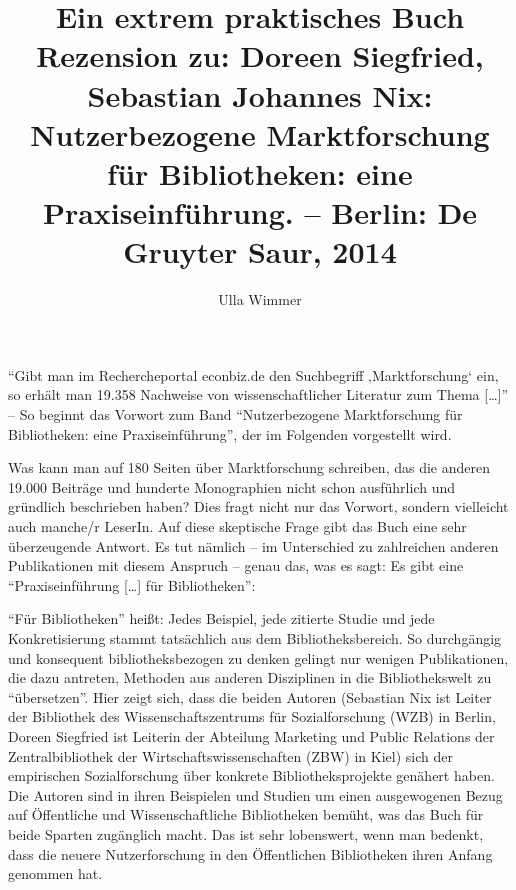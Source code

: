 \documentclass[a4paper,
fontsize=11pt,
oneside,
numbers=noperiodatend,
parskip=half-,
bibliography=totoc,
final
]{scrartcl}
\title{\LARGE{Ein extrem praktisches Buch} \\ \large{Rezension zu: 
Doreen Siegfried, Sebastian Johannes Nix: Nutzerbezogene Marktforschung für Bibliotheken: eine Praxiseinführung. – Berlin: De Gruyter Saur, 2014
}} %
\author{Ulla Wimmer} %
\date{}
\begin{document}
\maketitle
\thispagestyle{fancyplain} 





\enquote{Gibt man im Rechercheportal econbiz.de den Suchbegriff
‚Marktforschung` ein, so erhält man 19.358 Nachweise von
wissenschaftlicher Literatur zum Thema {[}\ldots{}{]}} -- So beginnt das
Vorwort zum Band \enquote{Nutzerbezogene Marktforschung für
Bibliotheken: eine Praxiseinführung}, der im Folgenden vorgestellt wird.

Was kann man auf 180 Seiten über Marktforschung schreiben, das die
anderen 19.000 Beiträge und hunderte Monographien nicht schon
ausführlich und gründlich beschrieben haben? Dies fragt nicht nur das
Vorwort, sondern vielleicht auch manche/r LeserIn. Auf diese skeptische
Frage gibt das Buch eine sehr überzeugende Antwort. Es tut nämlich -- im
Unterschied zu zahlreichen anderen Publikationen mit diesem Anspruch --
genau das, was es sagt: Es gibt eine \enquote{Praxiseinführung
{[}\ldots{}{]} für Bibliotheken}:

\enquote{Für Bibliotheken} heißt: Jedes Beispiel, jede zitierte Studie
und jede Konkretisierung stammt tatsächlich aus dem Bibliotheksbereich.
So durchgängig und konsequent bibliotheksbezogen zu denken gelingt nur
wenigen Publikationen, die dazu antreten, Methoden aus anderen
Disziplinen in die Bibliothekswelt zu \enquote{übersetzen}. Hier zeigt
sich, dass die beiden Autoren (Sebastian Nix ist Leiter der Bibliothek
des Wissenschaftszentrums für Sozialforschung (WZB) in Berlin, Doreen
Siegfried ist Leiterin der Abteilung Marketing und Public Relations der
Zentralbibliothek der Wirtschaftswissenschaften (ZBW) in Kiel) sich der
empirischen Sozialforschung über konkrete Bibliotheksprojekte genähert
haben. Die Autoren sind in ihren Beispielen und Studien um einen
ausgewogenen Bezug auf Öffentliche und Wissenschaftliche Bibliotheken
bemüht, was das Buch für beide Sparten zugänglich macht. Das ist sehr
lobenswert, wenn man bedenkt, dass die neuere Nutzerforschung in den
Öffentlichen Bibliotheken ihren Anfang genommen hat.
\end{document}
